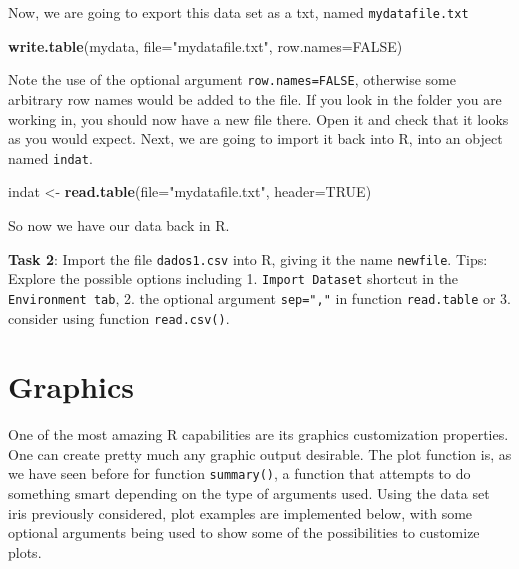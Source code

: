 \documentclass[]{book}
\newenvironment{Shaded}{\begin{snugshade}}{\end{snugshade}}
\newcommand{\KeywordTok}[1]{\textcolor[rgb]{0.13,0.29,0.53}{\textbf{#1}}}
\newcommand{\DataTypeTok}[1]{\textcolor[rgb]{0.13,0.29,0.53}{#1}}
\newcommand{\StringTok}[1]{\textcolor[rgb]{0.31,0.60,0.02}{#1}}
\newcommand{\OtherTok}[1]{\textcolor[rgb]{0.56,0.35,0.01}{#1}}
\newcommand{\NormalTok}[1]{#1}
\theoremstyle{definition}
\theoremstyle{definition}
\theoremstyle{remark}
\begin{document}
Now, we are going to export this data set as a txt, named
\texttt{mydatafile.txt}

\begin{Shaded}
\begin{Highlighting}[]
\KeywordTok{write.table}\NormalTok{(mydata, }\DataTypeTok{file=}\StringTok{"mydatafile.txt"}\NormalTok{, }\DataTypeTok{row.names=}\OtherTok{FALSE}\NormalTok{)}
\end{Highlighting}
\end{Shaded}

Note the use of the optional argument \texttt{row.names=FALSE},
otherwise some arbitrary row names would be added to the file. If you
look in the folder you are working in, you should now have a new file
there. Open it and check that it looks as you would expect. Next, we are
going to import it back into R, into an object named \texttt{indat}.

\begin{Shaded}
\begin{Highlighting}[]
\NormalTok{indat <-}\StringTok{ }\KeywordTok{read.table}\NormalTok{(}\DataTypeTok{file=}\StringTok{"mydatafile.txt"}\NormalTok{, }\DataTypeTok{header=}\OtherTok{TRUE}\NormalTok{)}
\end{Highlighting}
\end{Shaded}

So now we have our data back in R.

\textbf{Task 2}: Import the file \texttt{dados1.csv} into R, giving it
the name \texttt{newfile}. Tips: Explore the possible options including
1. \texttt{Import\ Dataset} shortcut in the \texttt{Environment\ tab},
2. the optional argument \texttt{sep=","} in function
\texttt{read.table} or 3. consider using function \texttt{read.csv()}.

\section{Graphics}\label{graphics}

One of the most amazing R capabilities are its graphics customization
properties. One can create pretty much any graphic output desirable. The
plot function is, as we have seen before for function
\texttt{summary()}, a function that attempts to do something smart
depending on the type of arguments used. Using the data set iris
previously considered, plot examples are implemented below, with some
optional arguments being used to show some of the possibilities to
customize plots.
\end{document}
